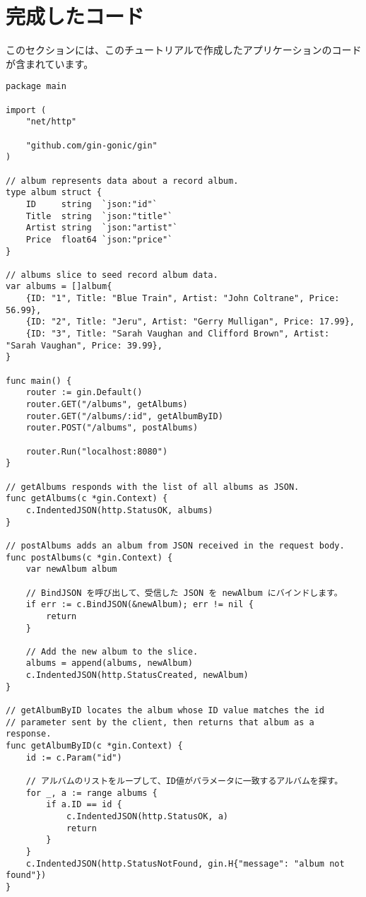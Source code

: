 
\section{完成したコード}

このセクションには、このチュートリアルで作成したアプリケーションのコードが含まれています。

\begin{lstlisting}[numbers=none]
package main

import (
    "net/http"

    "github.com/gin-gonic/gin"
)

// album represents data about a record album.
type album struct {
    ID     string  `json:"id"`
    Title  string  `json:"title"`
    Artist string  `json:"artist"`
    Price  float64 `json:"price"`
}

// albums slice to seed record album data.
var albums = []album{
    {ID: "1", Title: "Blue Train", Artist: "John Coltrane", Price: 56.99},
    {ID: "2", Title: "Jeru", Artist: "Gerry Mulligan", Price: 17.99},
    {ID: "3", Title: "Sarah Vaughan and Clifford Brown", Artist: "Sarah Vaughan", Price: 39.99},
}

func main() {
    router := gin.Default()
    router.GET("/albums", getAlbums)
    router.GET("/albums/:id", getAlbumByID)
    router.POST("/albums", postAlbums)

    router.Run("localhost:8080")
}

// getAlbums responds with the list of all albums as JSON.
func getAlbums(c *gin.Context) {
    c.IndentedJSON(http.StatusOK, albums)
}

// postAlbums adds an album from JSON received in the request body.
func postAlbums(c *gin.Context) {
    var newAlbum album

    // BindJSON を呼び出して、受信した JSON を newAlbum にバインドします。
    if err := c.BindJSON(&newAlbum); err != nil {
        return
    }

    // Add the new album to the slice.
    albums = append(albums, newAlbum)
    c.IndentedJSON(http.StatusCreated, newAlbum)
}

// getAlbumByID locates the album whose ID value matches the id
// parameter sent by the client, then returns that album as a response.
func getAlbumByID(c *gin.Context) {
    id := c.Param("id")

    // アルバムのリストをループして、ID値がパラメータに一致するアルバムを探す。
    for _, a := range albums {
        if a.ID == id {
            c.IndentedJSON(http.StatusOK, a)
            return
        }
    }
    c.IndentedJSON(http.StatusNotFound, gin.H{"message": "album not found"})
}
\end{lstlisting}
